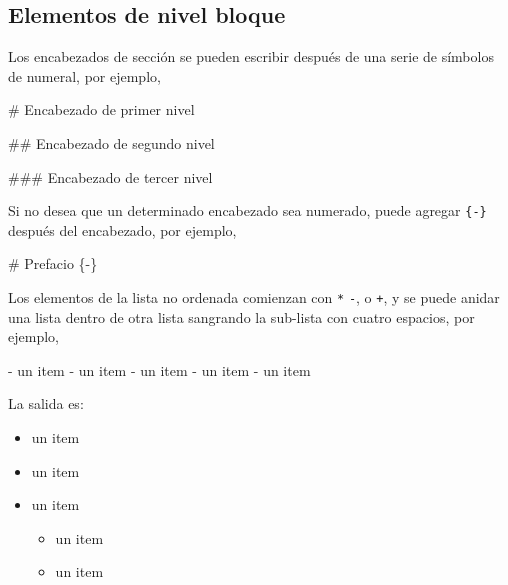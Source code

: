 \documentclass[12pt,]{krantz}
\makeatletter
\newenvironment{Shaded}{\begin{snugshade}}{\end{snugshade}}
\newcommand{\FloatTok}[1]{\textcolor[rgb]{0.00,0.00,0.81}{#1}}
\newcommand{\FunctionTok}[1]{\textcolor[rgb]{0.00,0.00,0.00}{#1}}
\newcommand{\NormalTok}[1]{#1}
\providecommand{\tightlist}{%
  \setlength{\itemsep}{0pt}\setlength{\parskip}{0pt}}
\newenvironment{kframe}{%
\medskip{}
\setlength{\fboxsep}{.8em}
 \def\at@end@of@kframe{}%
 \ifinner\ifhmode%
  \def\at@end@of@kframe{\end{minipage}}%
  \begin{minipage}{\columnwidth}%
 \fi\fi%
 \def\FrameCommand##1{\hskip\@totalleftmargin \hskip-\fboxsep
 \colorbox{shadecolor}{##1}\hskip-\fboxsep
     \hskip-\linewidth \hskip-\@totalleftmargin \hskip\columnwidth}%
 \MakeFramed {\advance\hsize-\width
   \@totalleftmargin\z@ \linewidth\hsize
   \@setminipage}}%
 {\par\unskip\endMakeFramed%
 \at@end@of@kframe}
\renewenvironment{Shaded}{\begin{kframe}}{\end{kframe}}
\theoremstyle{definition}
\theoremstyle{definition}
\theoremstyle{definition}
\theoremstyle{remark}
\makeatother
\begin{document}
\subsection{Elementos de nivel bloque}\label{elementos-de-nivel-bloque}

Los encabezados de sección se pueden escribir después de una serie de
símbolos de numeral, por ejemplo,

\begin{Shaded}
\begin{Highlighting}[]
\FunctionTok{# Encabezado de primer nivel}

\FunctionTok{## Encabezado de segundo nivel}

\FunctionTok{### Encabezado de tercer nivel}
\end{Highlighting}
\end{Shaded}

Si no desea que un determinado encabezado sea numerado, puede agregar
\texttt{\{-\}} después del encabezado, por ejemplo,

\begin{Shaded}
\begin{Highlighting}[]
\FunctionTok{# Prefacio \{-\}}
\end{Highlighting}
\end{Shaded}

Los elementos de la lista no ordenada comienzan con \texttt{*}
\texttt{-}, o \texttt{+}, y se puede anidar una lista dentro de otra
lista sangrando la sub-lista con cuatro espacios, por ejemplo,

\begin{Shaded}
\begin{Highlighting}[]
\NormalTok{- }\FloatTok{un item}
\FloatTok{- un item}
\FloatTok{- un item}
\FloatTok{    - un item}
\FloatTok{    - un item}
\end{Highlighting}
\end{Shaded}

La salida es:

\begin{itemize}
\tightlist
\item
  un item
\item
  un item
\item
  un item

  \begin{itemize}
  \tightlist
  \item
    un item
  \item
    un item
  \end{itemize}
\end{itemize}
\end{document}
